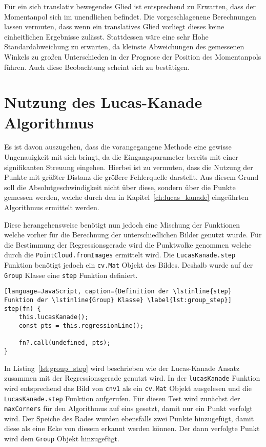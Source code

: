 Für ein sich translativ bewegendes Glied ist entsprechend zu Erwarten, dass der Momentanpol sich im unendlichen befindet.
Die vorgeschlagenene Berechnungen lassen vermuten, dass wenn ein translatives Glied vorliegt dieses keine einheitlichen Ergebnisse zulässt.
Stattdessen wäre eine sehr Hohe Standardabweichung zu erwarten, da kleinste Abweichungen des gemessenen Winkels zu großen Unterschieden in der Prognose der Position des Momentanpols führen.
Auch diese Beobachtung scheint sich zu bestätigen.

\section{Nutzung des Lucas-Kanade Algorithmus}

Es ist davon auszugehen, dass die vorangegangene Methode eine gewisse Ungenauigkeit mit sich bringt, da die Eingangsparameter bereits mit einer signifikanten Streuung eingehen.
Hierbei ist zu vermuten, dass die Nutzung der Punkte mit größter Distanz die größere Fehlerquelle darstellt.
Aus diesem Grund soll die Absolutgeschwindigkeit nicht über diese, sondern über die Punkte gemessen werden, welche durch den in Kapitel~\ref{ch:lucas_kanade} eingeührten Algorithmus ermittelt werden.

Diese herangehensweise benötigt nun jedoch eine Mischung der Funktionen welche vorher für die Berechnung der unterschiedlichen Bilder genutzt wurde.
Für die Bestimmung der Regressionsgerade wird die Punktwolke genommen welche durch die \lstinline{PointCloud.fromImages} ermittelt wird.
Die \lstinline{LucasKanade.step} Funktion benötigt jedoch ein \lstinline{cv.Mat} Objekt des Bildes.
Deshalb wurde auf der \lstinline{Group} Klasse eine \lstinline{step} Funktion definiert.

\begin{lstlisting}[language=JavaScript, caption={Definition der \lstinline{step} Funktion der \lstinline{Group} Klasse} \label{lst:group_step}]
step(fn) {
    this.lucasKanade();
    const pts = this.regressionLine();

    fn?.call(undefined, pts);
}
\end{lstlisting}

In Listing~\ref{lst:group_step} wird beschrieben wie der Lucas-Kanade Ansatz zusammen mit der Regressionsgerade genutzt wird.
In der \lstinline{lucasKanade} Funktion wird entsprechend das Bild von \lstinline{cnv1} als ein \lstinline{cv.Mat} Objekt ausgelesen und die \lstinline{LucasKanade.step} Funktion aufgerufen.
Für diesen Test wird zunächst der \lstinline{maxCorners} für den  Algorithmus auf eins gesetzt, damit nur ein Punkt verfolgt wird.
Der Speiche des Rades wurden ebensfalls zwei Punkte hinzugefügt, damit diese als eine Ecke von diesem erkannt werden können.
Der dann verfolgte Punkt wird dem \lstinline{Group} Objekt hinzugefügt.

